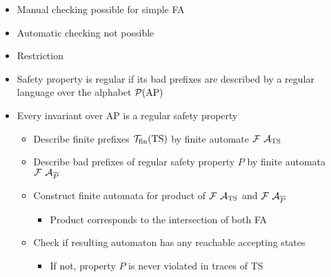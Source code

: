 \begin{itemize}
\begin{itemize}
\begin{itemize}
\begin{itemize}
\begin{itemize}
                                        \begin{itemize}
                                            \item Manual checking possible for simple FA
                                            \item Automatic checking not possible
                                        \end{itemize}
                                \end{itemize}
                                \begin{itemize}
                                    \item Restriction
                                    \item Safety property is regular if its bad prefixes are described by a regular language over the alphabet $\mathcal{P}(\text{AP})$
                                    \item Every invariant over AP is a regular safety property
                                        \begin{itemize}
                                            \item Describe finite prefixes $\mathcal{T}_{\text{fin}}(\text{TS})$ by finite automate $\mc{F} \ \mc{A}_{\text{TS}}$
                                            \item Describe bad prefixes of regular safety property $P$ by finite automata $\mc{F} \ \mc{A}_{\ob{P}}$
                                            \item Construct finite automata for product of $\mc{F} \ \mc{A}_{\text{TS}}$ and $\mc{F} \ \mc{A}_{\ob{P}}$
                                                \begin{itemize}
                                                    \item Product corresponds to the intersection of both FA
                                                \end{itemize}
                                            \item Check if resulting automaton has any reachable accepting states
                                                \begin{itemize}
                                                    \item If not, property $P$ is never violated in traces of TS

\end{itemize}
\end{itemize}
\end{itemize}
\end{itemize}
\end{itemize}
\end{itemize}
\end{itemize}
